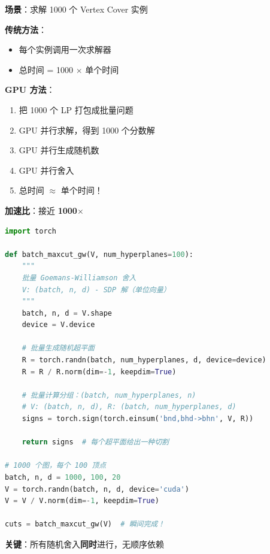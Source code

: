 \documentclass[12pt, a4paper]{ctexart}
\begin{document}
\begin{gpubox}[随机舍入的批量并行]

\textbf{场景}：求解 1000 个 Vertex Cover 实例

\textbf{传统方法}：
\begin{itemize}
    \item 每个实例调用一次求解器
    \item 总时间 = 1000 $\times$ 单个时间
\end{itemize}

\textbf{GPU 方法}：
\begin{enumerate}
    \item 把 1000 个 LP 打包成批量问题
    \item GPU 并行求解，得到 1000 个分数解
    \item GPU 并行生成随机数
    \item GPU 并行舍入
    \item 总时间 $\approx$ 单个时间！
\end{enumerate}

\textbf{加速比}：接近 \textbf{1000$\times$}

\end{gpubox}

\begin{blackboard}

\begin{lstlisting}[language=Python]
import torch

def batch_maxcut_gw(V, num_hyperplanes=100):
    """
    批量 Goemans-Williamson 舍入
    V: (batch, n, d) - SDP 解（单位向量）
    """
    batch, n, d = V.shape
    device = V.device
    
    # 批量生成随机超平面
    R = torch.randn(batch, num_hyperplanes, d, device=device)
    R = R / R.norm(dim=-1, keepdim=True)
    
    # 批量计算分组：(batch, num_hyperplanes, n)
    # V: (batch, n, d), R: (batch, num_hyperplanes, d)
    signs = torch.sign(torch.einsum('bnd,bhd->bhn', V, R))
    
    return signs  # 每个超平面给出一种切割

# 1000 个图，每个 100 顶点
batch, n, d = 1000, 100, 20
V = torch.randn(batch, n, d, device='cuda')
V = V / V.norm(dim=-1, keepdim=True)

cuts = batch_maxcut_gw(V)  # 瞬间完成！
\end{lstlisting}

\textbf{关键}：所有随机舍入\textbf{同时}进行，无顺序依赖

\end{blackboard}
\end{document}
